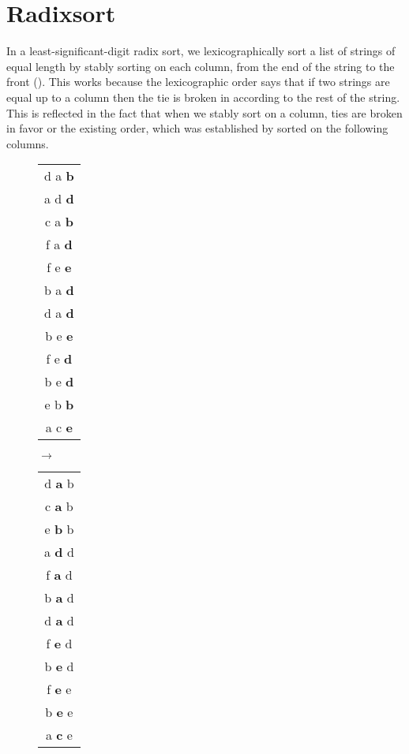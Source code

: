 \documentclass[sigplan,10pt,anonymous,review]{thesis}
\begin{document}
\section{Radixsort}
\label{sec:sort}

In a least-significant-digit radix sort, we lexicographically sort a
list of strings of equal length by stably sorting on each column, from
the end of the string to the front (). This
works because the lexicographic order says that if two strings are
equal up to a column then the tie is broken in according to the rest
of the string. This is reflected in the fact that when we stably sort
on a column, ties are broken in favor or the existing order, which was
established by sorted on the following columns.

\begin{figure}[!hb]
  \centering
  \begin{tt}
    \begin{tabular}{c}
      d a \textbf{b} \\
      a d \textbf{d} \\
      c a \textbf{b} \\
      f a \textbf{d} \\
      f e \textbf{e} \\
      b a \textbf{d} \\
      d a \textbf{d} \\
      b e \textbf{e} \\
      f e \textbf{d} \\
      b e \textbf{d} \\
      e b \textbf{b} \\
      a c \textbf{e}
    \end{tabular}
    $\rightarrow$
    \begin{tabular}{c}
      d \textbf{a} b \\
      c \textbf{a} b \\
      e \textbf{b} b \\
      a \textbf{d} d \\
      f \textbf{a} d \\
      b \textbf{a} d \\
      d \textbf{a} d \\
      f \textbf{e} d \\
      b \textbf{e} d \\
      f \textbf{e} e \\
      b \textbf{e} e \\
      a \textbf{c} e
    \end{tabular}

\end{tt}
\end{figure}
\end{document}

